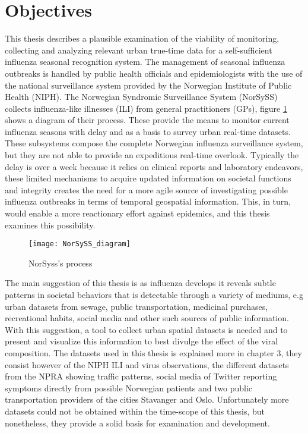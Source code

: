 \section{Objectives}
This thesis describes a plausible examination of the viability of monitoring, collecting and analyzing relevant urban true-time data for a self-sufficient influenza seasonal recognition system. The management of seasonal influenza outbreaks is handled by public health officials and epidemiologists with the use of the national surveillance system provided by the Norwegian Institute of Public Health (NIPH)\cite{niph}. The Norwegian Syndromic Surveillance System (NorSySS) collects influenza-like illnesses (ILI) from general practitioners (GPs)\cite{NorSySS}, figure \ref{fig:norsyss} shows a diagram of their process. These provide the means to monitor current influenza seasons with delay and as a basis to survey urban real-time datasets. These subsystems compose the complete Norwegian influenza surveillance system, but they are not able to provide an expeditious real-time overlook. Typically the delay is over a week because it relies on clinical reports and laboratory endeavors, these limited mechanisms to acquire updated information on societal functions and integrity creates the need for a more agile source of investigating possible influenza outbreaks in terms of temporal geospatial information. This, in turn, would enable a more reactionary effort against epidemics, and this thesis examines this possibility.

\begin{figure}[h]
\texttt{[image: NorSySS\_diagram]}
\centering
\caption{NorSyss's process}
\label{fig:norsyss}
\end{figure}

The main suggestion of this thesis is as influenza develops it reveals subtle patterns in societal behaviors that is detectable through a variety of mediums, e.g urban datasets from sewage, public transportation, medicinal purchases, recreational habits, social media and other such sources of public information. With this suggestion, a tool to collect urban spatial datasets is needed and to present and visualize this information to best divulge the effect of the viral composition. The datasets used in this thesis is explained more in chapter 3, they consist however of the NIPH ILI and virus observations, the different datasets from the NPRA showing traffic patterns, social media of Twitter reporting symptoms directly from possible Norwegian patients and two public transportation providers of the cities Stavanger and Oslo. Unfortunately more datasets could not be obtained within the time-scope of this thesis, but nonetheless, they provide a solid basis for examination and development.


